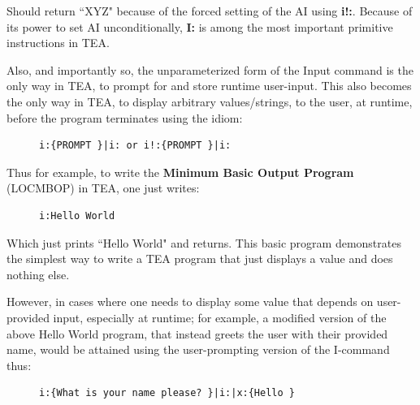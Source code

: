 \documentclass[a4paper, 18pt]{book} %
\begin{document}
  
Should return ``XYZ" because of the forced setting of the AI using \textbf{i!:}. Because of its power to set AI unconditionally, \textbf{I:} is among the most important primitive instructions in TEA.   
  

Also, and importantly so, the unparameterized form of the Input command is the only way in TEA, to prompt for and store runtime user-input. This also becomes the only way in TEA, to display arbitrary values/strings, to the user, at runtime, before the program terminates using the idiom: 


  \begin{figure}[H]
 \Large
  \centering
  \begin{tcolorbox}[teaterminalstyle, title=I: EXAMPLE 4]
  \begin{lstlisting}[language=TEA]
i:{PROMPT }|i: or i!:{PROMPT }|i:
   \end{lstlisting}
  \end{tcolorbox}
\end{figure}

Thus for example, to write the \textbf{Minimum Basic Output Program} (LOCMBOP)\cite{lutalo2023dnapsoe} in TEA, one just writes:

  
  \begin{figure}[H]
 \Large
  \centering
  \begin{tcolorbox}[teaterminalstyle, title=I: EXAMPLE 5: Minimum Basic Output Program (LOCMBOP): Basic Hello World]
  \begin{lstlisting}[language=TEA]
i:Hello World 
   \end{lstlisting}
  \end{tcolorbox}
\end{figure}  
  
  
Which just prints ``Hello World" and returns. This basic program demonstrates the simplest way to write a TEA program that just displays a value and does nothing else.   


However, in cases where one needs to display some value that depends on user-provided input, especially at runtime; for example, a modified version of the above Hello World program, that instead greets the user with their provided name, would be attained using the user-prompting version of the I-command thus:



  \begin{figure}[H]
 \Large
  \centering
  \begin{tcolorbox}[teaterminalstyle, title=I: EXAMPLE 6: Interactive Hello World]
  \begin{lstlisting}[language=TEA]
i:{What is your name please? }|i:|x:{Hello }
   \end{lstlisting}
  \end{tcolorbox}
\end{figure}  
\end{document}
